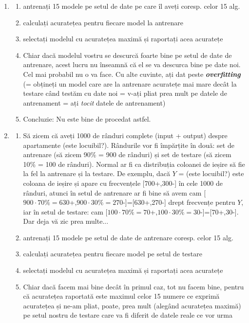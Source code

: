 \documentclass[12pt]{article}
\begin{document}
	\begin{enumerate}
		\item 
		\begin{enumerate}
			\item antrenați 15 modele pe setul de date pe care îl aveți coresp. celor 15 alg.
			\item calculați acuratețea pentru fiecare model la antrenare
			\item selectați modelul cu acuratețea maximă și raportați acea acuratețe
			\item Chiar dacă modelul vostru se descurcă foarte bine pe setul de date de antrenare, acest lucru nu înseamnă că el se va descurca bine pe date noi. Cel mai probabil nu o va face. Cu alte cuvinte, ați dat peste \textit{\textbf{overfitting}} (= obțineți un model care are la antrenare acuratețe mai mare decât la testare când testăm cu date noi = v-ați pliat prea mult pe datele de antrenament = ați \textit{tocit} datele de antrenament)
			\item Concluzie: Nu este bine de procedat astfel.
		\end{enumerate}
		\item \begin{enumerate}
			\item Să zicem că aveți 1000 de rânduri complete (input + output) despre apartamente (este locuibil?). Rândurile vor fi împărțite în două: set de antrenare (să zicem 90\% = 900 de rânduri) și set de testare (să zicem 10\% = 100 de rânduri). Normal ar fi ca distribuția coloanei de ieșire să fie la fel la antrenare și la testare. De exemplu, dacă $Y$ = (este locuibil?) este coloana de ieșire și apare cu frecvențele [700+,300-] în cele 1000 de rânduri, atunci în setul de antrenare ar fi bine să avem cam [$900 \cdot 70\% = 630$+,$900 \cdot 30\% = 270$-]=[630+,270-] drept frecvențe pentru $Y$, iar în setul de testare: cam [$100 \cdot 70\% = 70$+,$100 \cdot 30\% = 30$-]=[70+,30-]. Dar deja vă zic prea multe... 
			\item antrenați 15 modele pe setul de date de antrenare coresp. celor 15 alg.
			\item calculați acuratețea pentru fiecare model pe setul de testare
			\item selectați modelul cu acuratețea maximă și raportați acea acuratețe
			\item Chiar dacă facem mai bine decât în primul caz, tot nu facem bine, pentru că acuratețea raportată este maximul celor 15 numere ce exprimă acuratețea și ne-am pliat, poate, prea mult (alegând acuratețea maximă) pe setul nostru de testare care va fi diferit de datele reale ce vor urma

\end{enumerate}
\end{enumerate}
\end{document}
